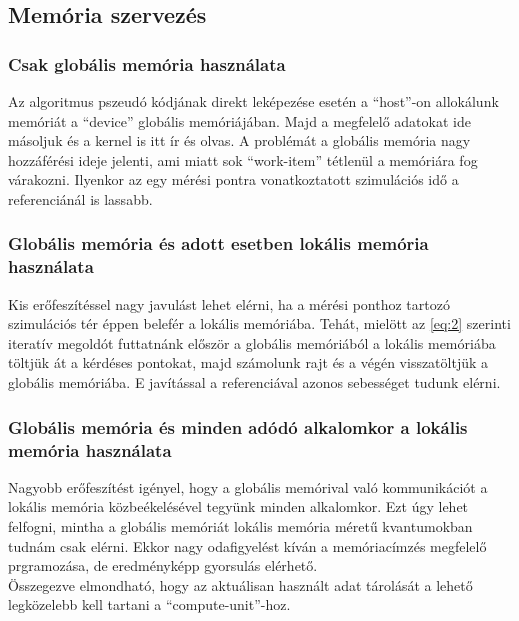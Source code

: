 	\subsection{Memória szervezés}
		\subsubsection{Csak globális memória használata}
		Az algoritmus pszeudó kódjának direkt leképezése esetén a ``host''-on
		allokálunk memóriát a ``device'' globális memóriájában.
		Majd a megfelelő adatokat ide másoljuk és a kernel is itt ír és olvas.
		A problémát a globális memória nagy hozzáférési ideje jelenti, ami miatt sok
		``work-item'' tétlenül a memóriára fog várakozni.
		Ilyenkor az egy mérési pontra vonatkoztatott szimulációs idő a
		referenciánál is lassabb.
		\subsubsection{Globális memória és adott esetben lokális memória használata}
		Kis erőfeszítéssel nagy javulást lehet elérni, ha a mérési ponthoz tartozó
		szimulációs tér éppen belefér a lokális memóriába.
		Tehát, mielött az \ref{eq:2} szerinti iteratív megoldót futtatnánk először a
		globális memóriából a lokális memóriába töltjük át a kérdéses pontokat, majd
		számolunk rajt és a végén visszatöltjük a globális memóriába.
		E javítással a referenciával azonos sebességet tudunk elérni.
		\subsubsection{Globális memória és minden adódó alkalomkor a lokális memória használata}
		Nagyobb erőfeszítést igényel, hogy a globális memórival való kommunikációt a
		lokális memória közbeékelésével tegyünk minden alkalomkor.
		Ezt úgy lehet felfogni, mintha a globális memóriát lokális memória méretű
		kvantumokban tudnám csak elérni.
		Ekkor nagy odafigyelést kíván a memóriacímzés megfelelő prgramozása, de
		eredményképp gyorsulás elérhető. \\
		
		Összegezve elmondható, hogy az aktuálisan használt adat tárolását a lehető
		legközelebb kell tartani a ``compute-unit''-hoz.
	
